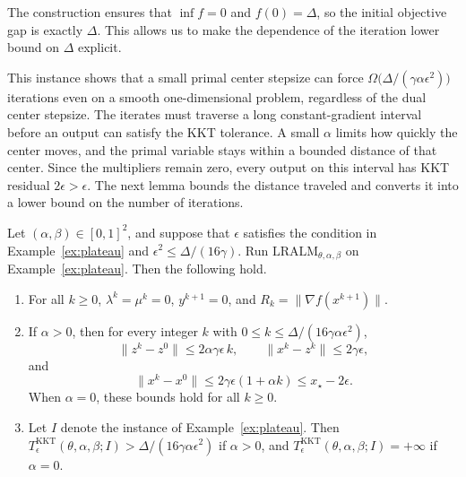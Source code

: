 \begin{remark}
\label{rem:plateau}
The construction ensures that \(\inf f=0\) and \(f(0)=\Delta\), so the
initial objective gap is exactly \(\Delta\). This allows us to make the
dependence of the iteration lower bound on \(\Delta\) explicit.
\end{remark}

This instance shows that a small primal center stepsize can force
\(\Omega\bigl(\Delta/(\gamma\alpha\epsilon^2)\bigr)\) iterations even on a
smooth one-dimensional problem, regardless of the dual center stepsize.
The iterates must traverse a long constant-gradient interval before an
output can satisfy the KKT tolerance. A small \(\alpha\) limits how quickly
the center moves, and the primal variable stays within a bounded distance
of that center. Since the multipliers remain zero, every output on this
interval has KKT residual \(2\epsilon>\epsilon\). The next lemma bounds the
distance traveled and converts it into a lower bound on the number of
iterations.

\begin{lemma}
\label{lem:plateau}
Let \((\alpha,\beta)\in[0,1]^2\), and suppose that \(\epsilon\) satisfies the
condition in Example~\ref{ex:plateau} and \(\epsilon^2\le\Delta/(16\gamma)\).
Run \(\mathrm{LRALM}_{\theta,\alpha,\beta}\) on Example~\ref{ex:plateau}.
Then the following hold.
\begin{enumerate}[label=(\roman*)]
\item For all \(k\ge0\), \(\lambda^k=\mu^k=0\), \(y^{k+1}=0\), and
  \(R_k=\|\nabla f(x^{k+1})\|\).
\item If \(\alpha>0\), then for every integer \(k\) with \(0\le k\le\Delta/(16\gamma\alpha\epsilon^2)\),
  \[
  \|z^k-z^0\|\le2\alpha\gamma\epsilon\,k,\qquad
  \|x^k-z^k\|\le2\gamma\epsilon,
  \]
  and
  \[
  \|x^k-x^0\|\le2\gamma\epsilon(1+\alpha k)
  \le x_\star-2\epsilon .
  \]
  When \(\alpha=0\), these bounds hold for all \(k\ge0\).
\item Let \(I\) denote the instance of Example~\ref{ex:plateau}. Then
  \(T^{\mathrm{KKT}}_\epsilon(\theta,\alpha,\beta;I)>\Delta/(16\gamma\alpha\epsilon^2)\)
  if \(\alpha>0\), and \(T^{\mathrm{KKT}}_\epsilon(\theta,\alpha,\beta;I)=+\infty\)
  if \(\alpha=0\).
\end{enumerate}
\end{lemma}

